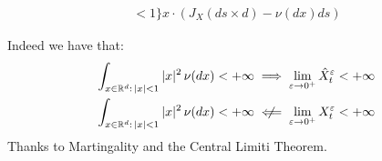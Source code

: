 \begin{definition}
\begin{enumerate}[i)]
\begin{itemize}
\begin{align*}
{                    < 1\}} x \cdot (J_X(ds \times d) - \nu(dx) ds) 
                \end{align*} 
            \end{itemize}
    \end{enumerate}
Indeed we have that:
\begin{align*}
    \int_{x\in\R^d: \, |x|<1} |x|^2 \, \nu(dx) < +\infty & \implies \lim_{
        \epsilon \to 0^+} \hat{X}^\epsilon_t < +\infty \\
    \int_{x\in\R^d: \, |x|<1} |x|^2 \, \nu(dx) < +\infty &  \centernot\impliedby
        \lim_{ \epsilon \to 0^+} X^\epsilon_t < +\infty
\end{align*}
Thanks to Martingality and the Central Limiti Theorem.
\end{definition}

